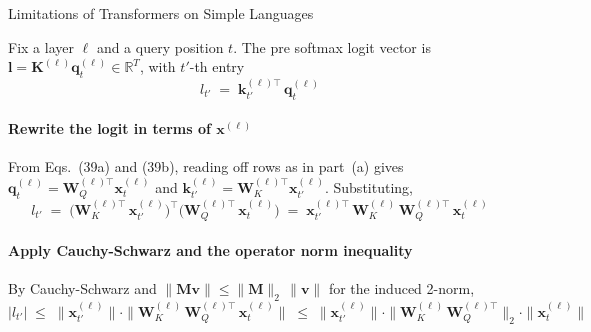 \begin{question}{Limitations of Transformers on Simple Languages}
\begin{subquestion}
    Fix a layer $\ell$ and a query position $t$. The pre softmax logit vector is $\mathbf{l} = \mathbf{K}^{(\ell)} \mathbf{q}_t^{(\ell)} \in \mathbb{R}^{T}$, with $t'$-th entry
    \begin{equation*}
        l_{t'} \;=\; \mathbf{k}_{t'}^{(\ell)\top}\, \mathbf{q}_{t}^{(\ell)}
    \end{equation*}

    \paragraph{Rewrite the logit in terms of $\mathbf{x}^{(\ell)}$}
    From Eqs.~(39a) and (39b), reading off rows as in part~(a) gives $\mathbf{q}_t^{(\ell)} = \mathbf{W}_Q^{(\ell)\top} \mathbf{x}_t^{(\ell)}$ and $\mathbf{k}_{t'}^{(\ell)} = \mathbf{W}_K^{(\ell)\top} \mathbf{x}_{t'}^{(\ell)}$. Substituting,
    \begin{equation*}
        l_{t'} \;=\; \bigl(\mathbf{W}_K^{(\ell)\top}\, \mathbf{x}_{t'}^{(\ell)}\bigr)^{\!\top}\bigl(\mathbf{W}_Q^{(\ell)\top}\, \mathbf{x}_{t}^{(\ell)}\bigr) \;=\; \mathbf{x}_{t'}^{(\ell)\top}\, \mathbf{W}_K^{(\ell)}\, \mathbf{W}_Q^{(\ell)\top}\, \mathbf{x}_{t}^{(\ell)}
    \end{equation*}

    \paragraph{Apply Cauchy-Schwarz and the operator norm inequality}
    By Cauchy-Schwarz and $\|\mathbf{M}\mathbf{v}\| \le \|\mathbf{M}\|_{2}\,\|\mathbf{v}\|$ for the induced 2-norm,
    \begin{equation*}
        |l_{t'}| \;\le\; \|\mathbf{x}_{t'}^{(\ell)}\| \cdot \|\mathbf{W}_K^{(\ell)}\, \mathbf{W}_Q^{(\ell)\top}\, \mathbf{x}_{t}^{(\ell)}\| \;\le\; \|\mathbf{x}_{t'}^{(\ell)}\| \cdot \|\mathbf{W}_K^{(\ell)}\, \mathbf{W}_Q^{(\ell)\top}\|_{2} \cdot \|\mathbf{x}_{t}^{(\ell)}\|
    \end{equation*}


\end{subquestion}
\end{question}
